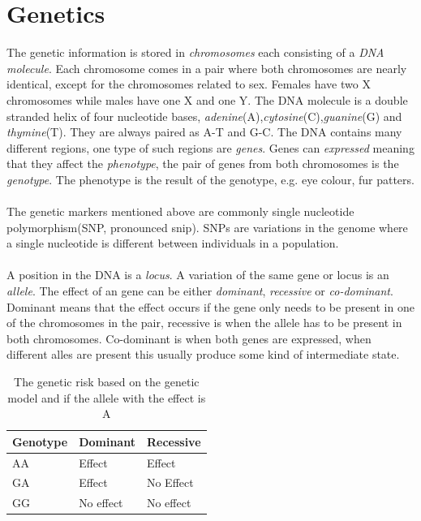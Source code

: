 \documentclass[10pt,a4paper]{report}
\begin{document}
\section{Genetics}
The genetic information is stored in \emph{chromosomes} each consisting of a \emph{DNA molecule}\cite{sadava_life}. Each chromosome comes in a pair where both chromosomes are nearly identical, except for the chromosomes related to sex\cite{sadava_life}. Females have two X chromosomes while males have one X and one Y\cite{sadava_life}. The DNA molecule is a double stranded helix of four nucleotide bases, \emph{adenine}(A),\emph{cytosine}(C),\emph{guanine}(G) and \emph{thymine}(T). They are always paired as A-T and G-C. The DNA contains many different regions, one type of such regions are \emph{genes}\cite{sadava_life}. Genes can \emph{expressed} meaning that they affect the \emph{phenotype}, the pair of genes from both chromosomes is the \emph{genotype}. The phenotype is the result of the genotype, e.g. eye colour, fur patters.\\
\\
The genetic markers mentioned above are commonly single nucleotide polymorphism(SNP, pronounced snip). SNPs are variations in the genome where a single nucleotide is different between individuals in a population\cite{sadava_life}.\\
\\
A position in the DNA is a \emph{locus}\cite{sadava_life}. A variation of the same gene or locus is an \emph{allele}\cite{sadava_life}. The effect of an gene can be either \emph{dominant}, \emph{recessive} or \emph{co-dominant}. Dominant means that the effect occurs if the gene only needs to be present in one of the chromosomes in the pair, recessive is when the allele has to be present in both chromosomes\cite{sadava_life}. Co-dominant is when both genes are expressed, when different alles are present this usually produce some kind of intermediate state\cite{sadava_life}.

\begin{table}[h]
\begin{tabular}{| l l l |}
  \hline
  Genotype & Dominant & Recessive\\
  \hline
  AA & Effect & Effect \\
  GA & Effect & No Effect \\
  GG & No effect & No effect \\
  \hline  
\end{tabular}
\caption{The genetic risk based on the genetic model and if the  allele with the effect is A}
\label{table:genetic}
\end{table}
\end{document}
